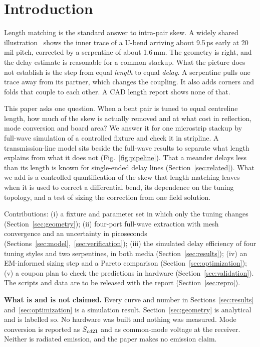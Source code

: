 \section{Introduction}

Length matching is the standard answer to intra-pair skew. A widely shared illustration~\cite{xpost} shows the
inner trace of a U-bend arriving about 9.5\,ps early at 20\,mil pitch, corrected by a serpentine of about
1.6\,mm. The geometry is right, and the delay estimate is reasonable for a common stackup. What the picture does
not establish is the step from equal \emph{length} to equal \emph{delay}. A serpentine pulls one trace away from its partner, which changes the coupling. It also adds corners and folds
that couple to each other. A CAD length
report shows none of that.

This paper asks one question. When a bent pair is tuned to equal centreline length, how much of the skew is actually removed and at what cost in reflection, mode conversion and board area? We answer it for one microstrip
stackup by full-wave simulation of a controlled fixture and check it in stripline. A transmission-line model sits beside the full-wave results to separate what
length explains from what it does not (Fig.~\ref{fig:pipeline}). That a meander delays less than its length is
known for single-ended delay lines (Section~\ref{sec:related}). What we add is a controlled quantification of the
skew that length matching leaves when it is used to correct a differential bend, its dependence on the tuning
topology, and a test of sizing the correction from one field solution.

Contributions: (i) a fixture and parameter set in which only the tuning changes (Section~\ref{sec:geometry});
(ii) four-port full-wave extraction with mesh convergence and an uncertainty in picoseconds
(Sections~\ref{sec:model},~\ref{sec:verification}); (iii) the simulated delay efficiency of four tuning styles and
two serpentines, in both media (Section~\ref{sec:results}); (iv) an EM-informed sizing step and a Pareto comparison
(Section~\ref{sec:optimization}); (v) a coupon plan to check the predictions in hardware
(Section~\ref{sec:validation}). The scripts and data are to be released with the report (Section~\ref{sec:repro}).

\textbf{What is and is not claimed.} Every curve and number in Sections~\ref{sec:results}
and~\ref{sec:optimization} is a simulation result. Section~\ref{sec:geometry} is analytical and is labelled so.
No hardware was built and nothing was measured. Mode conversion is reported as $S_{cd21}$ and as common-mode
voltage at the receiver. Neither is radiated emission, and the paper makes no emission claim.

